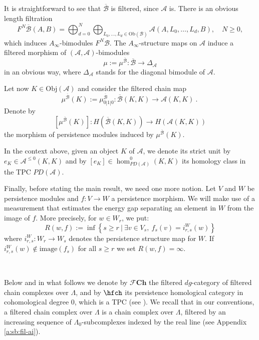 It is straightforward to see that $\overline{\mathcal{B}}$ is filtered, since $\mathcal{A}$ is. 
There is an obvious length filtration \begin{equation}\label{eq:lengthfiltration}
F^N\overline{\mathcal{B}}(A,B)= \bigoplus_{d=0}^N\bigoplus_{L_0,\ldots, L_d\in \text{Ob}(\mathcal{B})}\mathcal{A}(A,L_0,\ldots, L_d,B), \quad N\geq 0,
\end{equation} which induces $A_\infty$-bimodules $F^N{\mathcal{B}}$. The $A_\infty$-structure maps on $\mathcal{A}$ induce a filtered morphism of $(\mathcal{A},\mathcal{A})$-bimodules $$\mu:=\mu^{\overline{\mathcal{B}}} \colon \overline{\mathcal{B}}\to \Delta_\mathcal{A}$$ in an obvious way, where $\Delta_\mathcal{A}$ stands for the diagonal bimodule of $\mathcal{A}$.

Let now $K\in \text{Obj}(\mathcal{A})$ and consider the filtered chain map 
\begin{equation}\label{eq:bimod_map1}
	\mu^{\overline{\mathcal{B}}} (K) :=\mu^{\overline{\mathcal{B}}}_{0|1|0}\colon \overline{\mathcal{B}}(K,K)\to \mathcal{A}(K,K) ~.~
\end{equation} 
Denote by $$[\mu^{\overline{\mathcal{B}}}(K)]\colon H(\overline{\mathcal{B}}(K,K))\to H(\mathcal{A}(K,K))$$ the morphism of persistence modules induced by $\mu^{\overline{\mathcal{B}}}(K).$

In the context above,  given an object $K$ of $\mathcal{A}$, we denote its strict unit by $e_K\in \mathcal{A}^{\leq 0 }(K,K)$ and by $[e_K]\in \hom_{PD(\mathcal{A})}^0(K,K)$ its homology class in the TPC $PD(\mathcal{A})$. 

Finally, before stating the main result, we need one more notion. 
Let $V$ and $W$ be persistence modules and $f\colon V\to W$ a persistence morphism. We will make use of a measurement that estimates the energy gap
separating an element in $W$ from the image of $f$. More precisely, for  $w\in W_{r}$, we put:
\begin{equation}\label{eq:en_gap}
	R(w,f):=\inf\left\{s\geq r \ \lvert \ \exists v\in V_s, \ f_s(v) = i_{r,s}^W(w)\right\}
\end{equation} where $i^W_{r,s}\colon W_r\to W_s$ denotes the persistence structure map for $W$. If $i_{r,s}^W(w)\notin \text{image}(f_s)$ for all $s\geq r$ we set $R(w,f)=\infty$. 

\ 

Below and in what follows we denote by $\mathcal{F}\mathbf{Ch}$ the filtered $dg$-category of filtered chain complexes over $\Lambda$, and by $\hfch$ its persistence homological category in cohomological degree $0$, which is a TPC (see \cite[Section 2.5.2]{BCZ:tpc}). We recall that in our conventions, a filtered chain complex over $\Lambda$ is a chain complex over $\Lambda$, filtered by an increasing sequence of $\Lambda_0$-subcomplexes indexed by the real line (see Appendix \ref{a:sb:fil-ai}).

